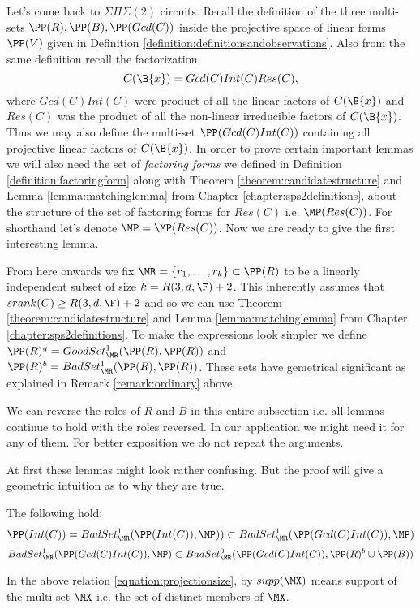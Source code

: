 Let's come back to $\Sigma\Pi\Sigma(2)$ circuits. Recall the definition of the three multi-sets $\PP(R),\PP(B),\PP(Gcd(C))$ inside the
projective space of linear forms $\PP(V)$ given in Definition \ref{definition:definitionsandobservations}. Also from the same definition
recall the factorization 
\[C(\B{x}) = Gcd(C)Int(C)Res(C),\]
where $Gcd(C)Int(C)$ were product of all the linear factors of $C(\B{x})$ and
$Res(C)$ was the product of all the non-linear irreducible factors of $C(\B{x})$. Thus we may also define the multi-set 
$\PP(Gcd(C)Int(C))$ containing all projective linear factors of $C(\B{x})$. In order to prove certain important lemmas we will
also need the set of \emph{factoring forms} we defined in Definition \ref{definition:factoringform} along with Theorem 
\ref{theorem:candidatestructure} and Lemma \ref{lemma:matchinglemma} from Chapter \ref{chapter:sps2definitions}, 
about the structure of the set of factoring forms for
$Res(C)$ i.e. $\MP(Res(C))$. For shorthand let's denote $\MP= \MP(Res(C))$. Now we are ready to give the first interesting
lemma.

From here onwards we fix $\MR = \{r_1,\ldots,r_k\} \subset \PP(R)$ to be a linearly independent subset of 
size $k = R(3,d,\F)+2$. This inherently
assumes that $srank(C)\geq R(3,d,\F)+2$ and so we can use Theorem \ref{theorem:candidatestructure} and Lemma \ref{lemma:matchinglemma}
from Chapter \ref{chapter:sps2definitions}.
To make the expressions look simpler we define $\PP(R)^g = GoodSet^1_\MR(\PP(R),\PP(R))$ and $\PP(R)^b = BadSet^1_\MR(\PP(R),\PP(R))$.
These sets have gemetrical significant as explained in Remark \ref{remark:ordinary} above.

\begin{framed}
\begin{note}
We can reverse the roles of $R$ and $B$ in this entire subsection i.e. all lemmas continue to hold with 
 the roles reversed. In our application we might need it for any of them. For better exposition we do not repeat the arguments.
\end{note}
 \end{framed}



At first these lemmas might look rather confusing. But the proof will give a geometric intuition as to why they are true.
\begin{lemma}\label{lemma:factors}
The following hold:
\begin{equation}\label{equation:onlygcdfactors}
  \PP(Int(C)) = BadSet^1_{\MR}(\PP(Int(C)),\MP)) \subset BadSet^1_{\MR}(\PP(Gcd(C)Int(C)),\MP) 
\end{equation}
\begin{equation}\label{equation:projectionsize}
 BadSet^1_{\MR}(\PP(Gcd(C)Int(C)),\MP)\subset BadSet^0_{\MR}(\PP(Gcd(C)Int(C)),\PP(R)^b\cup\PP(B)) 
\end{equation}
 
In the above relation \ref{equation:projectionsize}, by $supp(\MX)$ means support of the multi-set $\MX$ i.e.
the set of distinct members of $\MX$.
\end{lemma}

